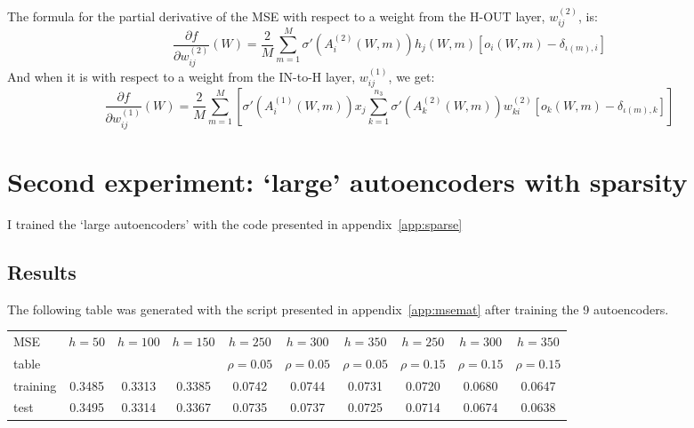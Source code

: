 \documentclass{article}
\begin{document}
The formula for the partial derivative of the MSE with respect to a weight from the H-OUT layer, $w^{(2)}_{ij}$, is:
\begin{equation}
\frac{\partial f}{\partial w^{(2)}_{ij}}(W)=\frac{2}{M}\sum_{m=1}^M\sigma'\left(A_i^{(2)}(W,m)\right)h_j(W,m)\left[o_i(W,m)-\delta_{\iota(m),i}\right] \label{one}
\end{equation}
And when it is with respect to a weight from the IN-to-H layer, $w^{(1)}_{ij}$, we get:
\begin{equation}
\frac{\partial f}{\partial w^{(1)}_{ij}}(W)=\frac{2}{M}
\sum_{m=1}^M\left[\sigma'\left(A_i^{(1)}(W,m)\right)x_j
\sum_{k=1}^{n_3}\sigma'\left(A_k^{(2)}(W,m)\right) w^{(2)}_{ki}\left[o_k(W,m)-\delta_{\iota(m),k}\right] \right]\label{two}
\end{equation}

\section{Second experiment: `large' autoencoders with sparsity}
I trained the `large autoencoders' with the code presented in appendix~\ref{app:sparse}
\subsection{Results}
The following table was generated with the script presented in appendix~\ref{app:msemat} after training the 9 autoencoders.\vspace{0.8cm}\\
{\centering
\begin{tabular}{l | c  cccccccc}
MSE& $h=50$&$h=100$&$h=150$&
$h=250$&$h=300$&$h=350$&
$h=250$&$h=300$&$h=350$\\ 
table& &&&
$ \rho=0.05$&$\rho=0.05$&$ \rho=0.05$&
$ \rho=0.15$&$\rho=0.15$&$\rho=0.15$\\ 
\hline
training & 0.3485  &  0.3313  &  0.3385  &  0.0742  &  0.0744  &  0.0731  &  0.0720  &  0.0680  &  0.0647\\
test &  0.3495   & 0.3314  &  0.3367   & 0.0735 &   0.0737  &  0.0725   & 0.0714 &   0.0674  &  0.0638
\end{tabular}}
\end{document}
